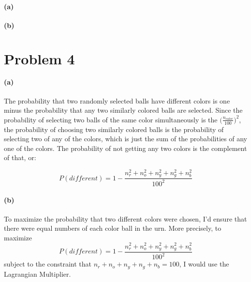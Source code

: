 \documentclass[12pt]{article}
\begin{document}
\paragraph{(a)}

\paragraph{(b)}

\section{Problem 4}\label{results}
\paragraph{(a)} The probability that two randomly selected balls have different colors is one minus the probability that any two similarly colored balls are selected. Since the probability of selecting two balls of the same color simultaneously is the $\big(\frac{n_{color}}{100}\big)^2$, the probability of choosing two similarly colored balls is the probability of selecting two of any of the colors, which is just the sum of the probabilities of any one of the colors. The probability of not getting any two colors is the complement of that, or:

$$ P(different) = 1 - \frac{n_r^2 + n_o^2 + n_y^2 + n_g^2 + n_b^2}{100^2}  $$

\paragraph{(b)} To maximize the probability that two different colors were chosen, I'd ensure that there were equal numbers of each color ball in the urn. More precisely, to maximize $$ P(different) = 1 - \frac{n_r^2 + n_o^2 + n_y^2 + n_g^2 + n_b^2}{100^2}  $$ subject to the constraint that $n_r + n_o + n_y + n_g + n_b = 100 $, I would use the Lagrangian Multiplier.
\end{document}
